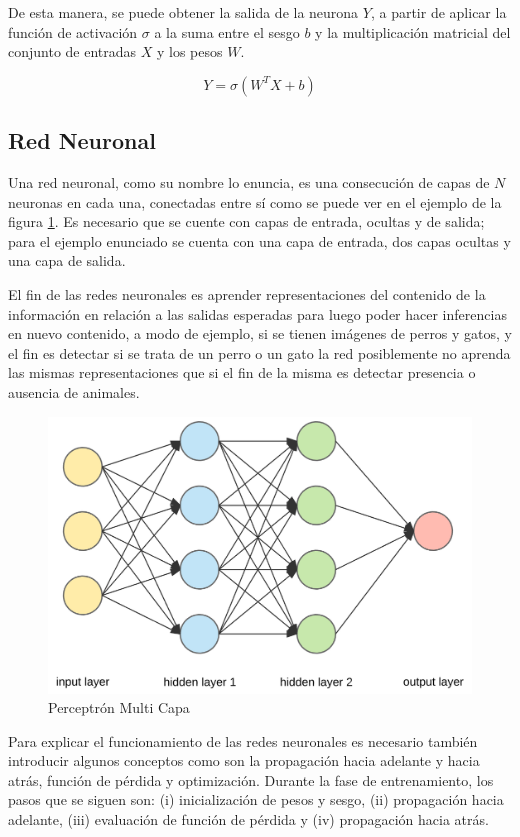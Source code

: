 De esta manera, se puede obtener la salida de la neurona \(Y\), a partir de aplicar la función de activación \(\sigma\) a la suma entre el sesgo \(b\) y la multiplicación matricial del conjunto de entradas \(X\) y los pesos \(W\).

\begin{equation}
Y=\sigma\left(W^{T} X+b\right)
\end{equation}


\subsection{Red Neuronal}\label{red_neuronal}
 Una red neuronal, como su nombre lo enuncia, es una consecución de capas de \(N\) neuronas en cada una, conectadas entre sí como se puede ver en el ejemplo de la figura \ref{fig:redneuronal}. Es necesario que se cuente con capas de entrada, ocultas y de salida; para el ejemplo enunciado se cuenta con una capa de entrada, dos capas ocultas y una capa de salida. 
 
 El fin de las redes neuronales es aprender representaciones del contenido de la información en relación a las salidas esperadas para luego poder hacer inferencias en nuevo contenido, a modo de ejemplo, si se tienen imágenes de perros y gatos, y el fin es detectar si se trata de un perro o un gato la red posiblemente no aprenda las mismas representaciones que si el fin de la misma es detectar presencia o ausencia de animales.
 
 
 \begin{figure}[!h]
 	\centering
 	\includegraphics[width=0.7\linewidth]{images/red_neuronal}
 	\caption[Ejemplo red neuronal]{Perceptrón Multi Capa}
 	\label{fig:redneuronal}
 \end{figure}
 Para explicar el funcionamiento de las redes neuronales es necesario también introducir algunos conceptos como son la propagación hacia adelante y hacia atrás, función de pérdida y optimización. Durante la fase de entrenamiento, los pasos que se siguen son:
 (i) inicialización de pesos y sesgo, (ii) propagación hacia adelante, (iii) evaluación de función de pérdida y (iv) propagación hacia atrás.
 
